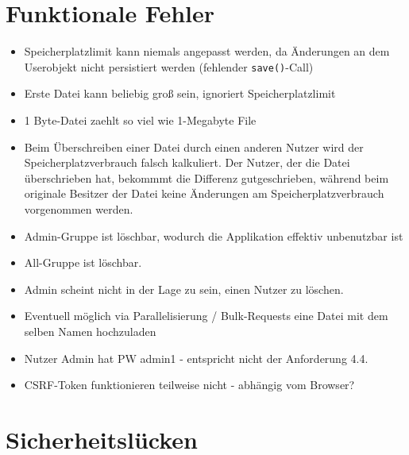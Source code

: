 \documentclass[12pt,DIV14,BCOR10mm,a4paper,parskip=half-,headsepline,headinclude,english,ngerman,bibliography=totocnumbered]{scrreprt}
\begin{document}
\vspace*{-3cm}

\tableofcontents  %

\chapter{Funktionale Fehler}

\begin{itemize}
  \item Speicherplatzlimit kann niemals angepasst werden, da Änderungen an dem Userobjekt nicht persistiert werden (fehlender \texttt{save()}-Call)
  \item Erste Datei kann beliebig groß sein, ignoriert Speicherplatzlimit
  \item 1 Byte-Datei zaehlt so viel wie 1-Megabyte File
  \item Beim Überschreiben einer Datei durch einen anderen Nutzer wird der Speicherplatzverbrauch falsch kalkuliert. Der Nutzer, der die Datei überschrieben hat, bekommmt die Differenz gutgeschrieben, während beim originale Besitzer der Datei keine Änderungen am Speicherplatzverbrauch vorgenommen werden.
  \item Admin-Gruppe ist löschbar, wodurch die Applikation effektiv unbenutzbar ist
  \item All-Gruppe ist löschbar.
  \item Admin scheint nicht in der Lage zu sein, einen Nutzer zu löschen.
  \item Eventuell möglich via Parallelisierung / Bulk-Requests eine Datei mit dem selben Namen hochzuladen
  \item Nutzer Admin hat PW admin1 - entspricht nicht der Anforderung 4.4.
  \item CSRF-Token funktionieren teilweise nicht - abhängig vom Browser?
\end{itemize}

\chapter{Sicherheitslücken}
\end{document}
